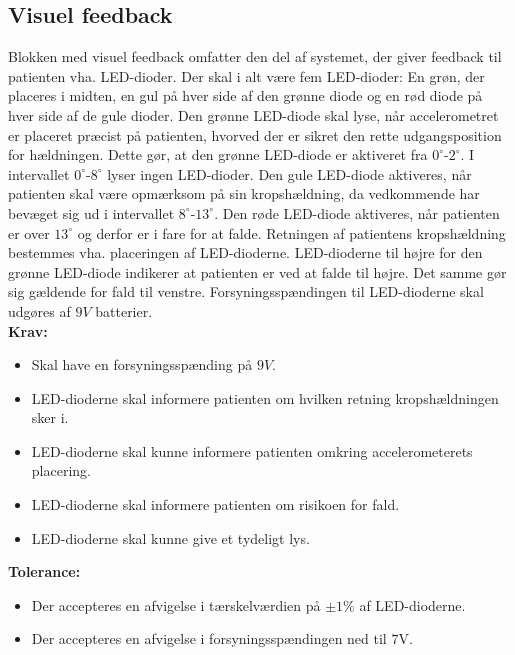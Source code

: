 \subsection{Visuel feedback}
Blokken med visuel feedback omfatter den del af systemet, der giver feedback til patienten vha. LED-dioder. Der skal i alt være fem LED-dioder: En grøn, der placeres i midten, en gul på hver side af den grønne diode og en rød diode på hver side af de gule dioder. Den grønne LED-diode skal lyse, når accelerometret er placeret præcist på patienten, hvorved der er sikret den rette udgangsposition for hældningen. Dette gør, at den grønne LED-diode er aktiveret fra $0^{\circ}$-$2^{\circ}$. I intervallet $0^{\circ}$-$8^{\circ}$ lyser ingen LED-dioder. Den gule LED-diode aktiveres, når patienten skal være opmærksom på sin kropshældning, da vedkommende har bevæget sig ud i intervallet $8^{\circ}$-$13^{\circ}$. Den røde LED-diode aktiveres, når patienten er over $13^{\circ}$ og derfor er i fare for at falde. Retningen af patientens kropshældning bestemmes vha. placeringen af LED-dioderne. LED-dioderne til højre for den grønne LED-diode indikerer at patienten er ved at falde til højre. Det samme gør sig gældende for fald til venstre. Forsyningsspændingen til LED-dioderne skal udgøres af $9V$ batterier.   
\\
\textbf{Krav:}
\begin{itemize}
	\item Skal have en forsyningsspænding på  $9V$.
	\item LED-dioderne skal informere patienten om hvilken retning kropshældningen sker i.
	\item LED-dioderne skal kunne informere patienten omkring accelerometerets placering.
	\item LED-dioderne skal informere patienten om risikoen for fald.
	\item LED-dioderne skal kunne give et tydeligt lys.
\end{itemize}
\textbf{Tolerance:}
\begin{itemize}
	\item Der accepteres en afvigelse i tærskelværdien på $\pm1\%$ af LED-dioderne.
	\item Der accepteres en afvigelse i forsyningsspændingen ned til $7$V.
\end{itemize}

